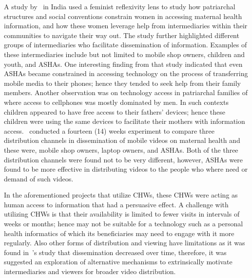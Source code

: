 A study by~\cite{kumar2015mobile} in India used a feminist reflexivity lens to study how patriarchal structures and social conventions constrain women in accessing maternal health information, and how these women leverage help from intermediaries within their communities to navigate their way out. The study further highlighted different groups of intermediaries who facilitate dissemination of information. Examples of these intermediaries include but not limited to mobile shop owners, children and youth, and ASHAs. One interesting finding from that study indicated that even ASHAs became constrained in accessing technology on the process of transferring mobile media to their phones; hence they tended to seek help from their family members. Another observation was on technology access in patriarchal families of where access to cellphones was mostly dominated by men. In such contexts children appeared to have free access to their fathers' devices; hence these children were using the same devices to facilitate their mothers with information access.~\cite{vashistha2016mobile} conducted a fourteen (14) weeks experiment to compare three distribution channels in dissemination of mobile videos on maternal health and these were, mobile shop owners, laptop owners, and ASHAs. Both of the three distribution channels were found not to be very different, however, ASHAs were found to be more effective in distributing videos to the people who where need or demand of such videos.

In the aforementioned projects that utilize CHWs, these CHWs were acting as human access to information that had a persuasive effect. A challenge with utilizing CHWs is that their availability is limited to fewer visits in intervals of weeks or months; hence may not be suitable for a technology such as a personal health informatics of which its beneficiaries may need to engage with it more regularly. Also other forms of distribution and viewing have limitations as it was found in~\cite{vashistha2016mobile}'s study that dissemination decreased over time, therefore, it was  suggested an exploration of alternative mechanisms  to extrinsically motivate intermediaries and viewers for broader video distribution.

